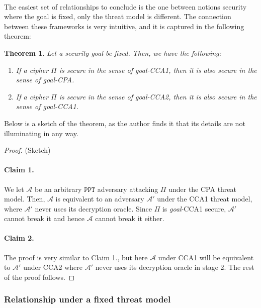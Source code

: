 \documentclass{article}
\newtheorem{theorem}{Theorem}[section]
\theoremstyle{definition}
\newcommand{\A}{\mathcal{A}}
\newcommand{\PPT}{\texttt{PPT}}
\begin{document}
\paragraph{} The easiest set of relationships to conclude is the one between
notions security where the goal is fixed, only the threat model is different.
The connection between these frameworks is very intuitive, and it is captured in
the following theorem:
\begin{theorem}
  Let a security goal be fixed. Then, we have the following:
  \begin{enumerate}
  \item If a cipher $\Pi$ is secure in the sense of \textit{goal}-CCA1, then it
    is also secure in the sense of \textit{goal}-CPA.
  \item If a cipher $\Pi$ is secure in the sense of \textit{goal}-CCA2, then it
    is also secure in the sense of \textit{goal}-CCA1.
  \end{enumerate}
\end{theorem}
Below is a sketch of the theorem, as the author finds it that its details are not
illuminating in any way.
\begin{proof}(Sketch)
  \paragraph{Claim 1.} We let $\A$ be an arbitrary $\PPT$ adversary attacking
  $\Pi$ under the CPA threat model. Then, $\A$ is equivalent to an adversary $\A'$ under the
  CCA1 threat model, where $\A'$ never uses its decryption oracle. Since $\Pi$
  is \textit{goal}-CCA1 secure, $\A'$ cannot break it and hence $\A$ cannot
  break it either.
  \paragraph{Claim 2.} The proof is very similar to Claim 1., but here $\A$
  under CCA1 will be equivalent to $\A'$ under CCA2 where $\A'$ never uses its
  decryption oracle in stage 2. The rest of the proof follows.
\end{proof}
\subsubsection{Relationship under a fixed threat model}
\end{document}
